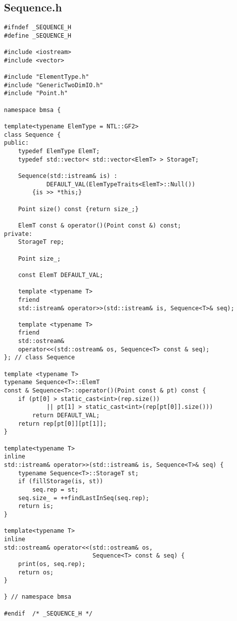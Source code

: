 \subsection*{Sequence.h}
\begin{lstlisting}
#ifndef _SEQUENCE_H
#define	_SEQUENCE_H

#include <iostream>
#include <vector>

#include "ElementType.h"
#include "GenericTwoDimIO.h"
#include "Point.h"

namespace bmsa {

template<typename ElemType = NTL::GF2>
class Sequence {
public:
    typedef ElemType ElemT;
    typedef std::vector< std::vector<ElemT> > StorageT;

    Sequence(std::istream& is) :
            DEFAULT_VAL(ElemTypeTraits<ElemT>::Null()) 
        {is >> *this;}

    Point size() const {return size_;}

    ElemT const & operator()(Point const &) const;
private:
    StorageT rep;

    Point size_;

    const ElemT DEFAULT_VAL;

    template <typename T>
    friend
    std::istream& operator>>(std::istream& is, Sequence<T>& seq);

    template <typename T>
    friend
    std::ostream&
    operator<<(std::ostream& os, Sequence<T> const & seq);
}; // class Sequence

template <typename T>
typename Sequence<T>::ElemT
const & Sequence<T>::operator()(Point const & pt) const {
    if (pt[0] > static_cast<int>(rep.size())
            || pt[1] > static_cast<int>(rep[pt[0]].size()))
        return DEFAULT_VAL;
    return rep[pt[0]][pt[1]];
}

template<typename T>
inline
std::istream& operator>>(std::istream& is, Sequence<T>& seq) {
    typename Sequence<T>::StorageT st;
    if (fillStorage(is, st))
        seq.rep = st;
    seq.size_ = ++findLastInSeq(seq.rep);
    return is;
}

template<typename T>
inline
std::ostream& operator<<(std::ostream& os, 
                         Sequence<T> const & seq) {
    print(os, seq.rep);
    return os;
}

} // namespace bmsa

#endif	/* _SEQUENCE_H */
\end{lstlisting}


